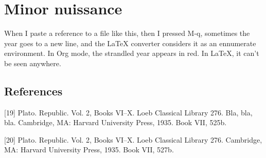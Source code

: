 \documentclass[11pt]{article}
\begin{document}
\section{Minor nuissance}

When I paste a reference to a file like this, then I pressed M-q, sometimes the year goes to a new line, and the LaTeX converter considers it as an ennumerate environment. In Org mode, the strandled year appears in red. In LaTeX, it can't be seen anywhere.

\subsection{References}

[19] Plato. Republic. Vol. 2, Books VI–X. Loeb Classical Library 276.
Bla, bla, bla. Cambridge, MA: Harvard University Press, 1935. Book
VII, 525b.

[20] Plato. Republic. Vol. 2, Books VI–X.  Loeb Classical Library 276. Cambridge, MA: Harvard University Press, 1935. Book VII, 527b.
\end{document}
